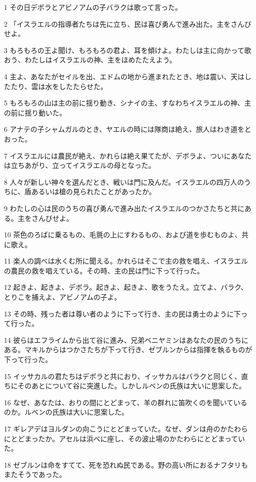 \par 1 その日デボラとアビノアムの子バラクは歌って言った。
\par 2 「イスラエルの指導者たちは先に立ち、民は喜び勇んで進み出た。主をさんびせよ。
\par 3 もろもろの王よ聞け、もろもろの君よ、耳を傾けよ。わたしは主に向かって歌おう、わたしはイスラエルの神、主をほめたたえよう。
\par 4 主よ、あなたがセイルを出、エドムの地から進まれたとき、地は震い、天はしたたり、雲は水をしたたらせた。
\par 5 もろもろの山は主の前に揺り動き、シナイの主、すなわちイスラエルの神、主の前に揺り動いた。
\par 6 アナテの子シャムガルのとき、ヤエルの時には隊商は絶え、旅人はわき道をとおった。
\par 7 イスラエルには農民が絶え、かれらは絶え果てたが、デボラよ、ついにあなたは立ちあがり、立ってイスラエルの母となった。
\par 8 人々が新しい神々を選んだとき、戦いは門に及んだ。イスラエルの四万人のうちに、盾あるいは槍の見られたことがあったか。
\par 9 わたしの心は民のうちの喜び勇んで進み出たイスラエルのつかさたちと共にある。主をさんびせよ。
\par 10 茶色のろばに乗るもの、毛氈の上にすわるもの、および道を歩むものよ、共に歌え。
\par 11 楽人の調べは水くむ所に聞える。かれらはそこで主の救を唱え、イスラエルの農民の救を唱えている。その時、主の民は門に下って行った。
\par 12 起きよ、起きよ、デボラ。起きよ、起きよ、歌をうたえ。立てよ、バラク、とりこを捕えよ、アビノアムの子よ。
\par 13 その時、残った者は尊い者のように下って行き、主の民は勇士のように下って行った。
\par 14 彼らはエフライムから出て谷に進み、兄弟ベニヤミンはあなたの民のうちにある。マキルからはつかさたちが下って行き、ゼブルンからは指揮を執るものが下って行った。
\par 15 イッサカルの君たちはデボラと共におり、イッサカルはバラクと同じく、直ちにそのあとについて谷に突進した。しかしルベンの氏族は大いに思案した。
\par 16 なぜ、あなたは、おりの間にとどまって、羊の群れに笛吹くのを聞いているのか。ルベンの氏族は大いに思案した。
\par 17 ギレアデはヨルダンの向こうにとどまっていた。なぜ、ダンは舟のかたわらにとどまったか。アセルは浜べに座し、その波止場のかたわらにとどまっていた。
\par 18 ゼブルンは命をすてて、死を恐れぬ民である。野の高い所におるナフタリもまたそうであった。
